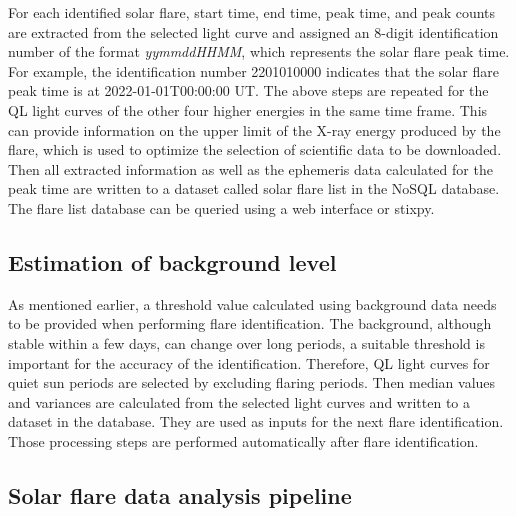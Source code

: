 \documentclass[referee]{aa} %
\begin{document}
For each identified solar flare,  start time, end time, peak time, and peak 
counts are extracted from the selected light curve and assigned 
an 8-digit identification number of the format {\it yymmddHHMM}, which represents the solar flare peak time. 
For example, the identification number 2201010000  indicates that 
the solar flare peak time is at 2022-01-01T00:00:00 UT. 
The above steps are repeated for the QL light curves of the other four higher energies
in the same time frame. This can provide information on the upper limit of the X-ray energy produced by the flare,
which is used to optimize the selection of scientific data to be downloaded. 
Then all extracted information as well as the ephemeris data calculated for the peak time are 
written to a dataset called solar flare list in the NoSQL database.
The flare list database can be queried using a web interface or stixpy.
\subsection{Estimation of background level}
As mentioned earlier, a threshold value calculated using background data needs to be provided when
performing flare identification.  
The background, although stable within a few days, can change over long periods,
 a suitable threshold is important for the accuracy of the identification. 
 Therefore, QL light curves for quiet sun periods are selected by excluding flaring periods. 
 Then median values and variances are calculated from the selected light curves and 
 written to a dataset in the database. They are used as inputs for the next flare identification. 
 Those processing steps are performed automatically after flare identification.

\subsection{Solar flare data analysis pipeline}
\end{document}
